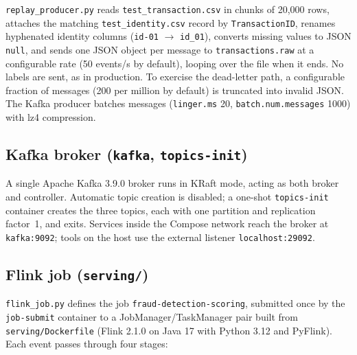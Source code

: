 \documentclass[11pt,a4paper]{article}
\newcommand{\code}[1]{\texttt{#1}}
\begin{document}
\code{replay\_producer.py} reads \code{test\_transaction.csv} in chunks of
20{,}000 rows, attaches the matching \code{test\_identity.csv} record by
\code{TransactionID}, renames hyphenated identity columns (\code{id-01}
$\to$ \code{id\_01}), converts missing values to JSON \code{null}, and sends
one JSON object per message to \code{transactions.raw} at a configurable rate
(50 events/s by default), looping over the file when it ends. No labels are
sent, as in production. To exercise the dead-letter path, a configurable
fraction of messages (200 per million by default) is truncated into invalid
JSON. The Kafka producer batches messages (\code{linger.ms} 20,
\code{batch.num.messages} 1000) with lz4 compression.

\subsection{Kafka broker (\code{kafka}, \code{topics-init})}

A single Apache Kafka 3.9.0 broker runs in KRaft mode, acting as both broker
and controller. Automatic topic creation is disabled; a one-shot
\code{topics-init} container creates the three topics, each with one partition
and replication factor~1, and exits. Services inside the Compose network reach
the broker at \code{kafka:9092}; tools on the host use the external listener
\code{localhost:29092}.

\subsection{Flink job (\code{serving/})}

\code{flink\_job.py} defines the job \code{fraud-detection-scoring}, submitted
once by the \code{job-submit} container to a JobManager/TaskManager pair built
from \code{serving/Dockerfile} (Flink 2.1.0 on Java 17 with Python 3.12 and
PyFlink). Each event passes through four stages:
\end{document}
